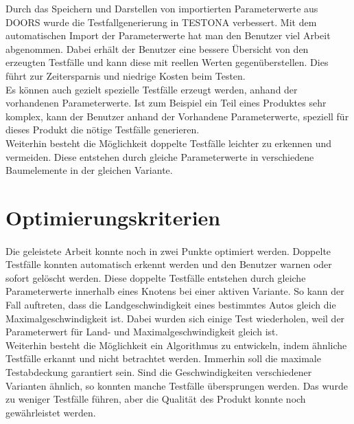 Durch das Speichern und Darstellen von importierten Parameterwerte aus DOORS wurde die Testfallgenerierung in TESTONA verbessert. Mit dem automatischen Import der Parameterwerte hat man den Benutzer viel Arbeit abgenommen. Dabei erhält der Benutzer eine bessere Übersicht von den erzeugten Testfälle und kann diese mit reellen Werten gegenüberstellen. Dies führt zur Zeitersparnis und niedrige Kosten beim Testen.\\


Es können auch gezielt spezielle Testfälle erzeugt werden, anhand der vorhandenen Parameterwerte. Ist zum Beispiel ein Teil eines Produktes sehr komplex, kann der Benutzer anhand der Vorhandene Parameterwerte, speziell für dieses Produkt die nötige Testfälle generieren.\\


Weiterhin besteht die Möglichkeit doppelte Testfälle leichter zu erkennen und vermeiden. Diese entstehen durch gleiche Parameterwerte in verschiedene Baumelemente in der gleichen Variante.\\




\newpage
\section{Optimierungskriterien}
\paragraph{}
Die geleistete Arbeit konnte noch in zwei Punkte optimiert werden. Doppelte Testfälle konnten automatisch erkennt werden und den Benutzer warnen oder sofort gelöscht werden. Diese doppelte Testfälle entstehen durch gleiche Parameterwerte innerhalb eines Knotens bei einer aktiven Variante. So kann der Fall auftreten, dass die Landgeschwindigkeit eines bestimmtes Autos gleich die Maximalgeschwindigkeit ist. Dabei wurden sich einige Test wiederholen, weil der Parameterwert für Land- und Maximalgeschwindigkeit gleich ist.\\


Weiterhin besteht die Möglichkeit ein Algorithmus zu entwickeln, indem ähnliche Testfälle erkannt und nicht betrachtet werden. Immerhin soll die maximale Testabdeckung garantiert sein. Sind die Geschwindigkeiten verschiedener Varianten ähnlich, so konnten manche Testfälle übersprungen werden. Das wurde zu weniger Testfälle führen, aber die Qualität des Produkt konnte noch gewährleistet werden.